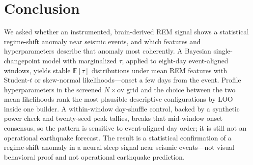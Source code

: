 \FloatBarrier

\section{Conclusion}

We asked whether an instrumented, brain-derived REM signal shows a statistical regime-shift anomaly near seismic events, and which features and hyperparameters describe that anomaly most coherently. A Bayesian single-changepoint model with marginalized \(\tau\), applied to eight-day event-aligned windows, yields stable \(\mathbb{E}[\tau]\) distributions under mean REM features with Student-\(t\) or skew-normal likelihoods—onset a few days from the event. Profile hyperparameters in the screened \(N\times\mathrm{ov}\) grid and the choice between the two mean likelihoods rank the most plausible descriptive configurations by LOO inside one builder. A within-window day-shuffle control, backed by a synthetic power check and twenty-seed peak tallies, breaks that mid-window onset consensus, so the pattern is sensitive to event-aligned day order; it is still not an operational earthquake forecast. The result is a statistical confirmation of a regime-shift anomaly in a neural sleep signal near seismic events---not visual behavioral proof and not operational earthquake prediction.
